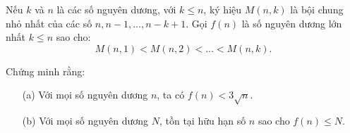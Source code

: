 \ifshowproblem
\begin{problem}\label{example:ROU-2015-TST-D3-P3}
    Nếu \( k \) và \( n \) là các số nguyên dương, với \( k \leq n \), ký hiệu \( M(n,k) \) là bội chung nhỏ nhất của các số 
    \( n, n-1, \ldots, n - k + 1 \).  
    Gọi \( f(n) \) là số nguyên dương lớn nhất \( k \leq n \) sao cho:
    \[
        M(n,1) < M(n,2) < \ldots < M(n,k).
    \]
    
    Chứng minh rằng:
    \begin{itemize}[topsep=0pt, partopsep=0pt, itemsep=0pt]
        \item[(a)] Với mọi số nguyên dương \( n \), ta có \( f(n) < 3\sqrt{n} \).
        \item[(b)] Với mọi số nguyên dương \( N \), tồn tại hữu hạn số \( n \) sao cho \( f(n) \leq N \).
    \end{itemize}
\end{problem}
\fi

\footnotemark
{}
\fi